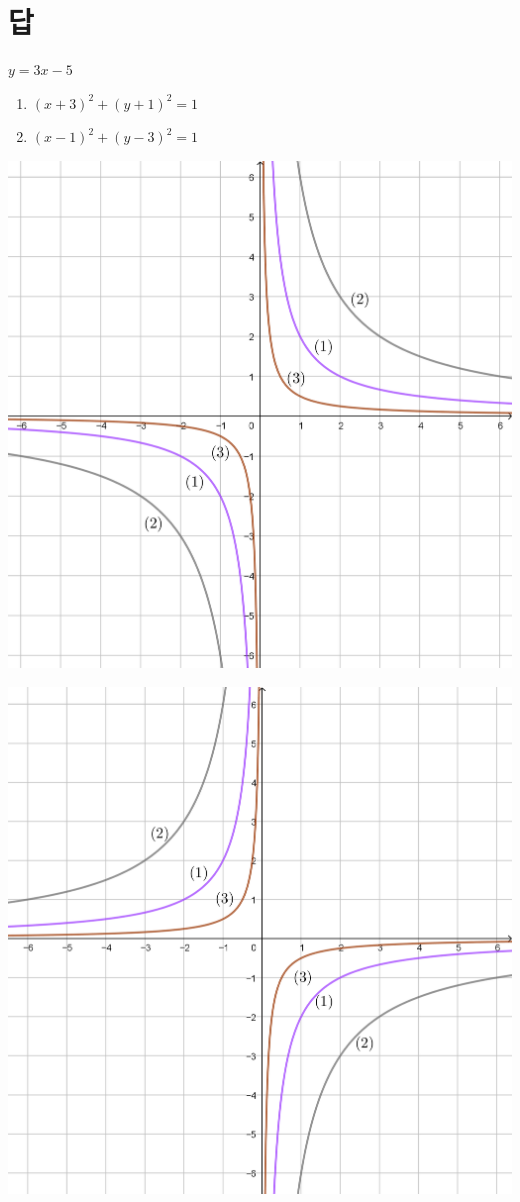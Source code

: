 \documentclass{oblivoir}
\begin{document}
\section*{답}
\begin{multicols*}{2}
%
\(y=3x-5\)

%
\begin{enumerate}
\item
\((x+3)^2+(y+1)^2=1\)
\item
\((x-1)^2+(y-3)^2=1\)
\end{enumerate}

%
\begin{center}
\includegraphics[width=0.8\columnwidth]{rational_2}
\end{center}

%
\begin{center}
\includegraphics[width=0.8\columnwidth]{rational_5}
\end{center}


\end{multicols*}
\end{document}
